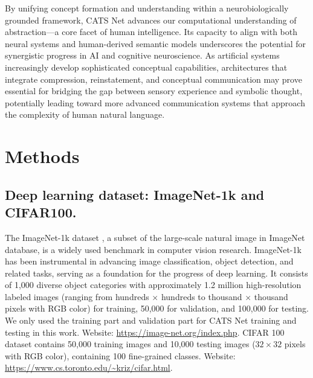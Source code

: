 \documentclass[pdflatex,sn-mathphys-num,lineno]{sn-jnl}%
\begin{document}
\begin{CJK}{UTF8}{gbsn}
By unifying concept formation and understanding within a neurobiologically grounded framework, CATS Net advances our computational understanding of abstraction—a core facet of human intelligence. Its capacity to align with both neural systems and human-derived semantic models underscores the potential for synergistic progress in AI and cognitive neuroscience. As artificial systems increasingly develop sophisticated conceptual capabilities, architectures that integrate compression, reinstatement, and conceptual communication may prove essential for bridging the gap between sensory experience and symbolic thought, potentially leading toward more advanced communication systems that approach the complexity of human natural language.


\section{Methods}
\subsection{Deep learning dataset: ImageNet-1k and CIFAR100.} The ImageNet-1k dataset \cite{deng_imagenet_2009}, a subset of the large-scale natural image in ImageNet database, is a widely used benchmark in computer vision research. ImageNet-1k has been instrumental in advancing image classification, object detection, and related tasks, serving as a foundation for the progress of deep learning. It consists of 1,000 diverse object categories with approximately 1.2 million high-resolution labeled images (ranging from hundreds $\times$ hundreds to thousand $\times$ thousand pixels with RGB color) for training, 50,000 for validation, and 100,000 for testing. We only used the training part and validation part for CATS Net training and testing in this work. Website: \url{https://image-net.org/index.php}. CIFAR 100 dataset \cite{krizhevsky_learning_2009} contains 50,000 training images and 10,000 testing images ($32\times32$ pixels with RGB color), containing 100 fine-grained classes. Website: \url{https://www.cs.toronto.edu/~kriz/cifar.html}.


\end{CJK}
\end{document}
